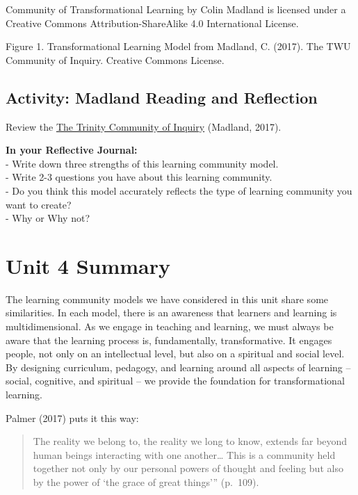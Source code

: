 \documentclass[
]{book}
\begin{document}
{Community of Transformational Learning} by Colin Madland is licensed under a Creative Commons Attribution-ShareAlike 4.0 International License.

Figure 1. Transformational Learning Model from Madland, C. (2017). The TWU Community of Inquiry. Creative Commons
License.

\hypertarget{activity-madland-reading-and-reflection}{%
\subsection*{Activity: Madland Reading and Reflection}\label{activity-madland-reading-and-reflection}}

\begin{reflect}
Review the \href{assets/unit4/Madland-transformational-learning.pdf}{The
Trinity Community of Inquiry} (Madland, 2017).

\textbf{In your Reflective Journal:}\\
- Write down three strengths of this learning community model.\\
- Write 2-3 questions you have about this learning community.\\
- Do you think this model accurately reflects the type of learning
community you want to create?\\
- Why or Why not?
\end{reflect}

\hypertarget{unit-4-summary}{%
\section*{Unit 4 Summary}\label{unit-4-summary}}

The learning community models we have considered in this unit share some similarities. In each model, there is an awareness that learners and learning is multidimensional. As we engage in teaching and learning, we must always be aware that the learning process is, fundamentally, transformative. It engages people, not only on an intellectual level, but also on a spiritual and social level. By designing curriculum, pedagogy, and learning around all aspects of learning -- social, cognitive, and spiritual -- we provide the foundation for transformational learning.

Palmer (2017) puts it this way:

\begin{quote}
The reality we belong to, the reality we long to know, extends far beyond human beings interacting with one another\ldots{} This is a community held together not only by our personal powers of thought and feeling but also by the power of `the grace of great things''' (p.~109).
\end{quote}
\end{document}
